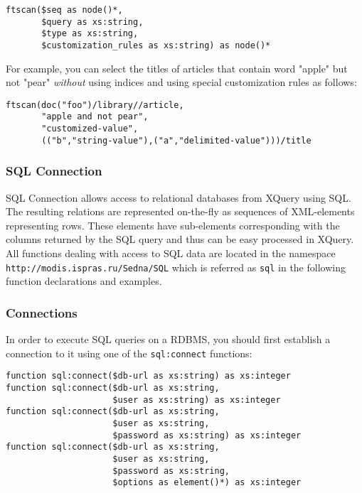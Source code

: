 \documentclass[a4paper,12pt]{article}
\begin{document}
\begin{verbatim}
ftscan($seq as node()*,
       $query as xs:string,
       $type as xs:string,
       $customization_rules as xs:string) as node()*
\end{verbatim}

For example, you can select the titles of articles that contain word "apple" but
not "pear" \emph{without} using indices and using special customization rules as
follows:

\begin{verbatim}
ftscan(doc("foo")/library//article,
       "apple and not pear",
       "customized-value",
       (("b","string-value"),("a","delimited-value")))/title
\end{verbatim}


\subsubsection{SQL Connection}

SQL Connection allows access to relational databases from XQuery using SQL. The
resulting relations are represented on-the-fly as sequences of XML-elements
representing rows. These elements have sub-elements corresponding with the
columns returned by the SQL query and thus can be easy processed in XQuery. All
functions dealing with access to SQL data are located in the namespace
\verb!http://modis.ispras.ru/Sedna/SQL! which is referred as \verb!sql! in the
following function declarations and examples.


\subsubsection*{Connections} In order to execute SQL queries on a RDBMS, you
should first establish a connection to it using one of the \verb!sql:connect!
functions:

\begin{verbatim}
function sql:connect($db-url as xs:string) as xs:integer
function sql:connect($db-url as xs:string,
                     $user as xs:string) as xs:integer
function sql:connect($db-url as xs:string,
                     $user as xs:string,
                     $password as xs:string) as xs:integer
function sql:connect($db-url as xs:string,
                     $user as xs:string,
                     $password as xs:string,
                     $options as element()*) as xs:integer
\end{verbatim}
\end{document}
